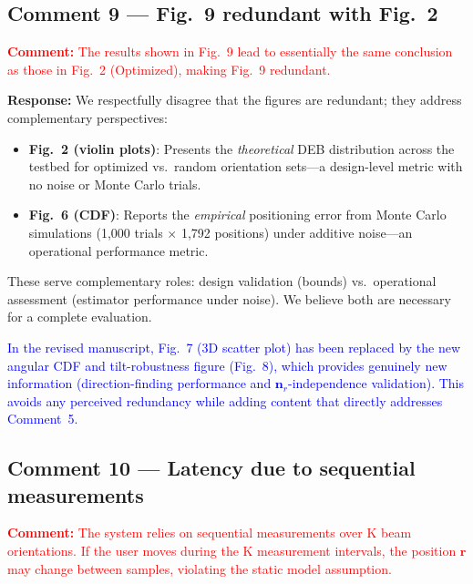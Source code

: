 \documentclass[11pt]{article}
\newcommand{\reviewercomment}[1]{\noindent\textcolor{red}{\textbf{Comment:} #1}\par\vspace{6pt}}
\newcommand{\response}{\noindent\textbf{Response:} }
\newcommand{\change}[1]{\textcolor{blue}{#1}}
\begin{document}
\subsection{Comment 9 --- Fig.~9 redundant with Fig.~2}

\reviewercomment{The results shown in Fig.~9 lead to essentially the same conclusion as those in Fig.~2 (Optimized), making Fig.~9 redundant.}

\response We respectfully disagree that the figures are redundant; they address complementary perspectives:

\begin{itemize}[leftmargin=*]
    \item \textbf{Fig.~2 (violin plots)}: Presents the \emph{theoretical} DEB distribution across the testbed for optimized vs.\ random orientation sets---a design-level metric with no noise or Monte Carlo trials.
    \item \textbf{Fig.~6 (CDF)}: Reports the \emph{empirical} positioning error from Monte Carlo simulations (1,000 trials $\times$ 1,792 positions) under additive noise---an operational performance metric.
\end{itemize}

These serve complementary roles: design validation (bounds) vs.\ operational assessment (estimator performance under noise). We believe both are necessary for a complete evaluation.

\change{In the revised manuscript, Fig.~7 (3D scatter plot) has been replaced by the new angular CDF and tilt-robustness figure (Fig.~8), which provides genuinely new information (direction-finding performance and $\mathbf{n}_r$-independence validation). This avoids any perceived redundancy while adding content that directly addresses Comment~5.}

\subsection{Comment 10 --- Latency due to sequential measurements}

\reviewercomment{The system relies on sequential measurements over K beam orientations. If the user moves during the K measurement intervals, the position $\mathbf{r}$ may change between samples, violating the static model assumption.}
\end{document}
